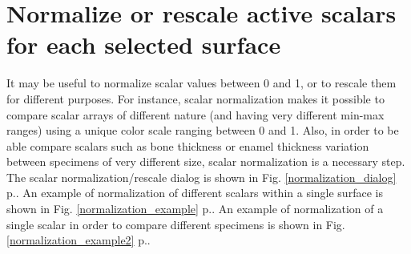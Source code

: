 \section{Normalize or rescale active scalars for each selected surface}
It may be useful to normalize scalar values between 0 and 1, or to rescale them for different purposes. For instance, scalar normalization makes it possible to compare scalar arrays of different nature (and having very different min-max ranges) using a unique color scale ranging between 0 and 1. Also, in order to be able compare scalars such as bone thickness or enamel thickness variation between specimens of very different size, scalar normalization is a necessary step. The scalar normalization/rescale dialog is shown in Fig. \ref{normalization_dialog} p.\pageref{normalization_dialog}. An example of normalization of different scalars within a single surface is shown in Fig. \ref{normalization_example} p.\pageref{normalization_example}. An example of normalization of a single scalar in order to compare different specimens is shown in Fig. \ref{normalization_example2} p.\pageref{normalization_example2}.

